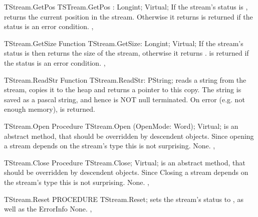 \begin{function}{TStream.GetPos}
\Declaration 
TSTream.GetPos : Longint; Virtual;
\Description
If the stream's status is ,  returns the current 
position in the stream. Otherwise it returns 
\Errors
{} is returned if the status is an error condition.
\SeeAlso
{}, 
\end{function}

\begin{function}{TStream.GetSize}
\Declaration
Function TStream.GetSize: Longint; Virtual;
\Description
If the stream's status is  then  returns
the size of the stream, otherwise it returns .
\Errors
{} is returned if the status is an error condition.
\SeeAlso
{}, 
\end{function}

\begin{function}{TStream.ReadStr}
\Declaration
Function TStream.ReadStr: PString;
\Description
{} reads a string from the stream, copies it to the heap
and returns a pointer to this copy. The string is saved as a pascal
string, and hence is NOT null terminated.
\Errors
On error (e.g. not enough memory),  is returned.
\SeeAlso
{}
\end{function}

\begin{procedure}{TStream.Open}
\Declaration
Procedure TStream.Open (OpenMode: Word); Virtual;
\Description
{} is an abstract method, that should be overridden by descendent
objects. Since opening a stream depends on the stream's type this is not
surprising.
\Errors
None.
\SeeAlso
{}, 
\end{procedure}

\begin{procedure}{TStream.Close}
\Declaration
Procedure TStream.Close; Virtual;
\Description
{} is an abstract method, that should be overridden by descendent
objects. Since Closing a stream depends on the stream's type this is not
surprising.
\Errors
None.
\SeeAlso
{}, 
\end{procedure}

\begin{procedure}{TStream.Reset}
\Declaration
PROCEDURE TStream.Reset;
\Description
{} sets the stream's status to , as well as the ErrorInfo
\Errors
None.
\SeeAlso
{}, 
\end{procedure}

